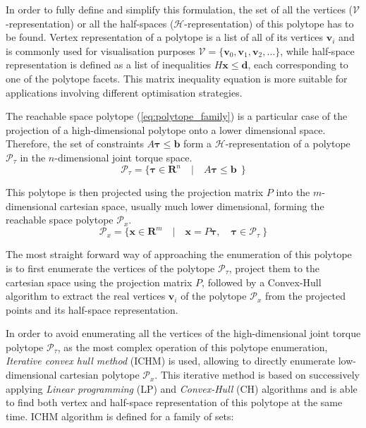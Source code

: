 In order to fully define and simplify this formulation, the set of all the vertices ($\mathcal{V}$-representation) or all the half-spaces ($\mathcal{H}$-representation) of this polytope has to be found. Vertex representation of a polytope is a list of all of its vertices $\bm{v}_i$ and is commonly used for visualisation purposes
$
\mathcal{V}\!= \!\{ \bm{v}_0, \bm{v}_1, \bm{v}_2, \dots \}
$,
while half-space representation is defined as a list of inequalities $H\bm{x} \leq \bm{d}$, each corresponding to one of the polytope facets. This matrix inequality equation is more suitable for applications involving different optimisation strategies.

The reachable space polytope (\ref{eq:polytope_family}) is a particular case of the projection of a high-dimensional polytope onto a lower dimensional space. Therefore, the set of constraints $A\bm{\tau}\leq\bm{b}$ form a $\mathcal{H}$-representation of a polytope $\mathcal{P}_\tau$ in the $n$-dimensional joint torque space.
\begin{equation}
    \mathcal{P}_\tau = \{ \bm{\tau} \in \mathbf{R}^n \quad| \quad A\bm{\tau}\leq \bm{b} ~~\}
\label{eq:polytope_torque}
\end{equation}

This polytope is then projected using the projection matrix $P$ into the $m$-dimensional cartesian space, usually much lower dimensional, forming the reachable space polytope $\mathcal{P}_x$.
\begin{equation}
    \mathcal{P}_x = \{ \bm{x} \in \mathbf{R}^m \quad| \quad \bm{x}=P\bm{\tau}, \quad \bm{\tau} \in \mathcal{P}_\tau ~\}
\label{eq:polytope_projection}
\end{equation}

The most straight forward way of approaching the enumeration of this polytope is to first enumerate the vertices of the polytope $\mathcal{P}_\tau$, project them to the cartesian space using the projection matrix $P$, followed by a Convex-Hull algorithm to extract the real vertices $\bm{v}_i$ of the polytope $\mathcal{P}_x$ from the projected points and its half-space representation.

In order to avoid enumerating all the vertices of the high-dimensional joint torque polytope $\mathcal{P}_\tau$, as the most complex operation of this polytope enumeration, \textit{Iterative convex hull method}\cite{skuric2022} (ICHM) is used, allowing to directly enumerate low-dimensional cartesian polytope $\mathcal{P}_x$. This iterative method is based on successively applying \textit{Linear programming} (LP) and \textit{Convex-Hull} (CH) algorithms and is able to find both vertex and half-space representation of this polytope at the same time. ICHM algorithm is defined for a family of sets:

